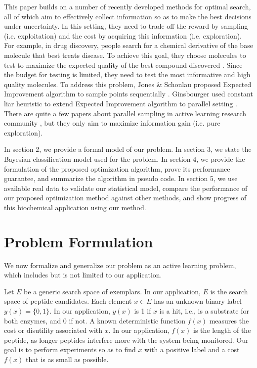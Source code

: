 \documentclass[opre,nonblindrev]{informs3} %
\begin{document}
This paper builds on a number of recently developed methods for optimal search, all of which aim to effectively collect information so as to make the best decisions under uncertainty. In this setting, they need to trade off the reward by sampling (i.e. exploitation) and the cost by acquiring this information (i.e. exploration). For example, in drug discovery, people search for a chemical derivative of the base molecule that best treats disease. To achieve this goal, they choose molecules to test to maximize the expected quality of the
best compound discovered \citep{Negoescu2010}. Since the budget for testing is limited, they need to test the most informative and high quality molecules. To address this problem, Jones \& Schonlau proposed Expected Improvement algorithm to sample points sequentially \citep{Jones1998}. Ginsbourger used constant liar heuristic to extend Expected Improvement algorithm to parallel setting \citep{Ginsbourger2008}. There are quite a few papers about parallel sampling in active learning research
community \citep{Chen2013, Hoi2006, Hoi2006a} , but they only aim to maximize information gain (i.e. pure exploration).

In section 2, we provide a formal model of our problem.  In section 3, we state the Bayesian classification model used for the problem. In section 4, we provide the formulation of the proposed optimization algorithm, prove its performance guarantee, and summarize the algorithm in pseudo code. In section 5, we use available real data to validate our statistical model, compare the performance of our proposed optimization method against
other methods, and show progress of this biochemical application using our method.

\section{Problem Formulation} \label{sec:problem}

We now formalize and generalize our problem as an active learning problem, which includes but is not limited to our application.

Let $E$ be a generic search space of exemplars.  In our application, $E$ is the search space of peptide candidates. Each element $x \in E$ has an unknown binary label $y(x)=\{0,1\}$.  In our application, $y(x)$ is 1 if $x$ is a hit, i.e., is a substrate for both enzymes, and 0 if not.
A known deterministic function $f(x)$ measures the cost or disutility associated with $x$.  In our application, $f(x)$ is the length of the peptide, as longer peptides interfere more with the system being monitored. Our goal is to perform experiments so as to find $x$ with a positive label and a cost $f(x)$ that is as small as
possible.
\end{document}
